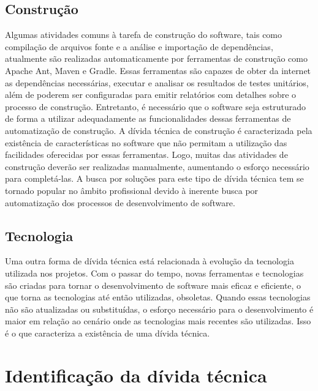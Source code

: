 \subsection{Construção}
Algumas atividades comuns à tarefa de construção do software, tais como compilação de arquivos fonte e a análise e importação de dependências, atualmente são realizadas automaticamente por ferramentas de construção como Apache Ant\cite{de2015learning}, Maven\cite{goldman2007maven} e Gradle\cite{muschko2014gradle}. Essas ferramentas são capazes de obter da internet as dependências necessárias, executar e analisar os resultados de testes unitários, além de poderem ser configuradas para emitir relatórios com detalhes sobre o processo de construção.  Entretanto, é necessário que o software seja estruturado de forma a utilizar adequadamente as funcionalidades dessas ferramentas de automatização de construção. A dívida técnica de construção é caracterizada pela existência de características no software que não permitam a utilização das facilidades oferecidas por essas ferramentas. Logo, muitas das atividades de construção deverão ser realizadas manualmente, aumentando o esforço necessário para completá-las.  A busca por soluções para este tipo de dívida técnica tem se tornado popular no âmbito profissional devido à inerente busca por automatização dos processos de desenvolvimento de software\cite{morgenthaler2012searching}.

\subsection{Tecnologia}
\label{tipo_td_tecnologia}

Uma outra forma de dívida técnica está relacionada à evolução da tecnologia utilizada nos projetos.  Com o passar do tempo, novas ferramentas e tecnologias são criadas para tornar o desenvolvimento de software mais eficaz e eficiente, o que torna as tecnologias até então utilizadas, obsoletas. Quando essas tecnologias não são atualizadas ou substituídas, o esforço necessário para o desenvolvimento é maior em relação ao cenário onde as tecnologias mais recentes são utilizadas. Isso é o que caracteriza a existência de uma dívida técnica.



\section{Identificação da dívida técnica}

